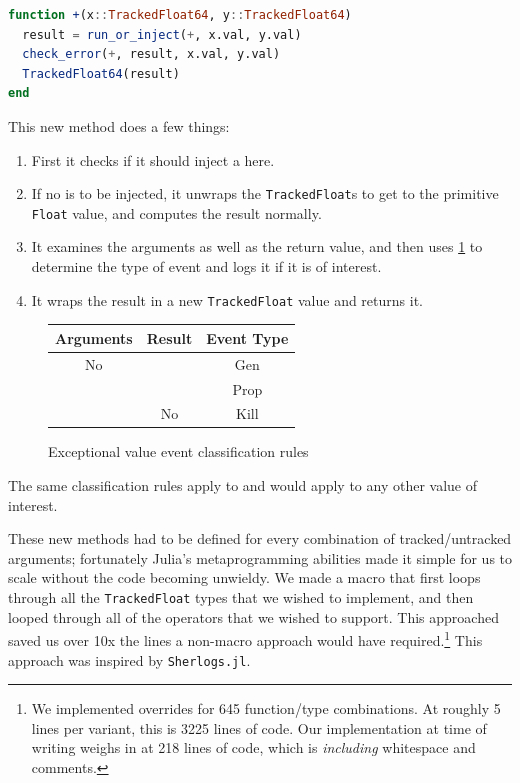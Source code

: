 \documentclass{juliacon}
\begin{document}
\begin{lstlisting}[language = Julia]
function +(x::TrackedFloat64, y::TrackedFloat64)
  result = run_or_inject(+, x.val, y.val)
  check_error(+, result, x.val, y.val)
  TrackedFloat64(result)
end
\end{lstlisting}

This new method does a few things:

\begin{enumerate}
\item First it checks if it should inject a \NaN{} here.
\item If no \NaN{} is to be injected, it unwraps the \texttt{TrackedFloat}s to get to the primitive \texttt{Float} value, and computes the result normally.
\item It examines the arguments as well as the return value, and then uses \cref{fig:lifetime-class} to determine the type of event and logs it if it is of interest.
\item It wraps the result in a new \texttt{TrackedFloat} value and returns it.
\end{enumerate}

\begin{figure}[h]
  \begin{tabular}{ccc}
    Arguments & Result & Event Type \\
    \hline
    No \NaN{} & \NaN{} & Gen \\
    \NaN{} & \NaN{} & Prop \\
    \NaN{} & No \NaN{} & Kill \\
  \end{tabular}
  \label{fig:lifetime-class}
  \caption{Exceptional value event classification rules}
\end{figure}

The same classification rules apply to \Inf{} and would apply to any other value of interest.

These new methods had to be defined for every combination of tracked/untracked arguments;
fortunately Julia's metaprogramming abilities made it simple for us to scale without the code becoming unwieldy.
We made a macro that first loops through all the \texttt{TrackedFloat} types that we wished to implement, and then looped through all of the operators that we wished to support.
This approached saved us over 10x the lines a non-macro approach would have required.\footnote{We implemented overrides for 645 function/type combinations. At roughly 5 lines per variant, this is 3225 lines of code. Our implementation at time of writing weighs in at 218 lines of code, which is \emph{including} whitespace and comments.}
This approach was inspired by \texttt{Sherlogs.jl}.\cite{kMilanklSherlogsJl2021}
\end{document}
